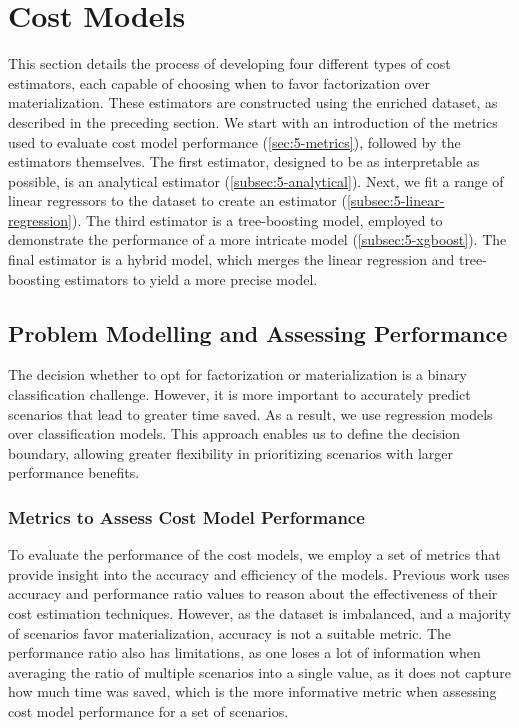\section{Cost Models}
\label{sec:5-cost-models}
This section details the process of developing four different types of cost estimators, each capable of choosing when to favor factorization over materialization. These estimators are constructed using the enriched dataset, as described in the preceding section. We start with an introduction of the metrics used to evaluate cost model performance (\autoref{sec:5-metrics}), followed by the estimators themselves. The first estimator, designed to be as interpretable as possible, is an analytical estimator (\autoref{subsec:5-analytical}). Next, we fit a range of linear regressors to the dataset to create an estimator (\autoref{subsec:5-linear-regression}). The third estimator is a tree-boosting model, employed to demonstrate the performance of a more intricate model (\autoref{subsec:5-xgboost}). The final estimator is a hybrid model, which merges the linear regression and tree-boosting estimators to yield a more precise model.

\subsection{Problem Modelling and Assessing Performance}
\label{sec:5-metrics}
The decision whether to opt for factorization or materialization is a binary classification challenge. However, it is more important to accurately predict scenarios that lead to greater time saved. As a result, we use regression models over classification models. This approach enables us to define the decision boundary, allowing greater flexibility in prioritizing scenarios with larger performance benefits.

\subsubsection{Metrics to Assess Cost Model Performance}
To evaluate the performance of the cost models, we employ a set of metrics that provide insight into the accuracy and efficiency of the models. Previous work \cite{schijndel_cost_estimation,orion_learning_gen_lin_models,MorpheusFI} uses accuracy and performance ratio values to reason about the effectiveness of their cost estimation techniques. However, as the dataset is imbalanced, and a majority of scenarios favor materialization, accuracy is not a suitable metric. The performance ratio also has limitations, as one loses a lot of information when averaging the ratio of multiple scenarios into a single value, as it does not capture how much time was saved, which is the more informative metric when assessing cost model performance for a set of scenarios.

